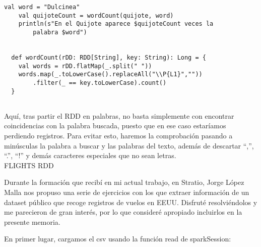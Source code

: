 \begin{lstlisting}[frame=single]
    val word = "Dulcinea"
    val quijoteCount = wordCount(quijote, word)
    println(s"En el Quijote aparece $quijoteCount veces la 
    	palabra $word")
    
    
  def wordCount(rDD: RDD[String], key: String): Long = {
    val words = rDD.flatMap(_.split(" "))
    words.map(_.toLowerCase().replaceAll("\\P{L1}",""))
    	.filter(_ == key.toLowerCase).count()
  }
    
\end{lstlisting}

Aquí, tras partir el RDD en palabras, no basta simplemente con encontrar coincidencias con la palabra buscada, puesto que en ese caso estaríamos perdiendo registros. Para evitar esto, haremos la comprobación pasando a minúsculas la palabra a buscar y las palabras del texto, además de descartar “,”, “.”, “!” y demás caracteres especiales que no sean letras. \\
     

FLIGHTS RDD

Durante la formación que recibí en mi actual trabajo, en Stratio, Jorge López Malla nos propuso una serie de ejercicios con los que extraer información de un dataset público que recoge registros de vuelos en EEUU. Disfruté resolviéndolos y me parecieron de gran interés, por lo que consideré apropiado incluirlos en la presente memoria. 

En primer lugar, cargamos el csv usando la función read de sparkSession: 


\begin{lstlisting}[frame=single]

\end{lstlisting}
